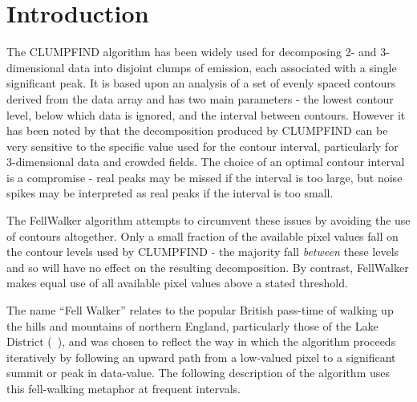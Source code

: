 \documentclass[final,authoryear,5p,times,twocolumn]{elsarticle}
\begin{document}

\newcommand{\mnras}{Mon Not R Astron Soc}
\newcommand{\aap}{Astron Astrophys}
\newcommand{\aaps}{Astron Astrophys Supp}
\newcommand{\pasp}{Pub Astron Soc Pacific}
\newcommand{\apj}{Astrophys J}
\newcommand{\apjs}{Astrophys J Supp}
\newcommand{\qjras}{Quart J R Astron Soc}
\newcommand{\an}{Astron.\ Nach.}
\newcommand{\ijimw}{Int.\ J.\ Infrared \& Millimeter Waves}
\newcommand{\procspie}{Proc.\ SPIE}
\newcommand{\aspconf}{ASP Conf. Ser.}


\section{Introduction}
\label{sec:intro}

The CLUMPFIND algorithm \citep[][ascl:1107.014]{1994Williams} has been widely used for
decomposing 2- and 3-dimensional data into disjoint clumps of emission,
each associated with a single significant peak. It is based upon an
analysis of a set of evenly spaced contours derived from the data array
and has two main parameters - the lowest contour level, below which
data is ignored, and the interval between contours. However it has been
noted by \cite{2009Pineda} that the decomposition produced by CLUMPFIND
can be very sensitive to the specific value used for the contour interval,
particularly for 3-dimensional data and crowded fields. The choice of an
optimal contour interval is a compromise - real peaks may be missed if
the interval is too large, but noise spikes may be interpreted as real
peaks if the interval is too small.

The FellWalker algorithm attempts to circumvent these issues by avoiding
the use of contours altogether. Only a small fraction of the available
pixel values fall on the contour levels used by CLUMPFIND - the majority
fall \emph{between} these levels and so will have no effect on the
resulting decomposition. By contrast, FellWalker makes equal use of all
available pixel values above a stated threshold.

The name ``Fell Walker'' relates to the popular British pass-time of
walking up the hills and mountains of northern England, particularly
those of the Lake District
(~), and was
chosen to reflect the way in which the algorithm proceeds iteratively by
following an upward path from a low-valued pixel to a significant summit
or peak in data-value. The following description of the algorithm uses
this fell-walking metaphor at frequent intervals.
\end{document}
